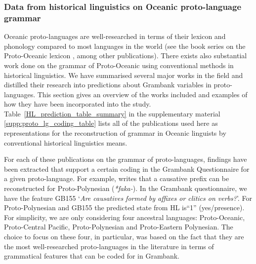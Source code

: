 \documentclass[12pt,letterpaper]{article}
\begin{document}
\FloatBarrier
\subsubsection{Data from historical linguistics on Oceanic proto-language grammar}
\label{sec:POC_lit_review}


Oceanic proto-languages are well-researched in terms of their lexicon and phonology compared to most languages in the world (see the book series on the Proto-Oceanic lexicon \citep{protooceanicvol1, protooceanicvol2, protooceanicvol3, protooceanicvol4, protooceanicvol5}, among other publications). There exists also substantial work done on the grammar of Proto-Oceanic using conventional methods in historical linguistics. We have summarised several major works in the field and distilled their research into predictions about Grambank variables in proto-languages. This section gives an overview of the works included and examples of how they have been incorporated into the study. Table~\ref{HL_prediction_table_summary} in the supplementary material \ref{supp:proto_lg_coding_table} lists all of the publications used here as representations for the reconstruction of grammar in Oceanic linguists by conventional historical linguistics means.

For each of these publications on the grammar of proto-languages, findings have been extracted that support a certain coding in the Grambank Questionnaire for a given proto-language. For example, \citet[4]{marck2000_encyclo} writes that a causative prefix can be reconstructed for Proto-Polynesian (\emph{*faka-}). In the Grambank questionnaire, we have the feature GB155 `\emph{Are causatives formed by affixes or clitics on verbs?}'. For Proto-Polynesian and GB155 the predicted state from HL is``1'' (yes/presence). For simplicity, we are only considering four ancestral languages: Proto-Oceanic, Proto-Central Pacific, Proto-Polynesian and Proto-Eastern Polynesian. The choice to focus on these four, in particular, was based on the fact that they are the most well-researched proto-languages in the literature in terms of grammatical features that can be coded for in Grambank. 
\end{document}
